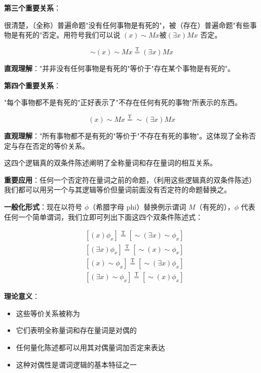 \begin{theorembox}[title=量词对偶关系的第三组]
\textbf{第三个重要关系}：

很清楚，（全称）普遍命题"没有任何事物是有死的"，被（存在）普遍命题"有些事物是有死的"否定。用符号我们可以说 $(x) \sim M x$被$(\exists x) M x$ 否定。

$$
\sim(x) \sim M x \stackrel{\mathrm{T}}{=} (\exists x) M x
$$

\textbf{直观理解}："并非没有任何事物是有死的"等价于"存在某个事物是有死的"。
\end{theorembox}

\begin{theorembox}[title=量词对偶关系的第四组]
\textbf{第四个重要关系}：

"每个事物都不是有死的"正好表示了"不存在任何有死的事物"所表示的东西。

$$
(x) \sim M x \stackrel{\mathrm{T}}{=} \sim(\exists x) M x
$$

\textbf{直观理解}："所有事物都不是有死的"等价于"不存在有死的事物"。这体现了全称否定与存在否定的等价关系。
\end{theorembox}

\begin{theorembox}[title=量词对偶关系的一般化]
这四个逻辑真的双条件陈述阐明了全称量词和存在量词的相互关系。

\textbf{重要应用}：任何一个否定符在量词之前的命题，（利用这些逻辑真的双条件陈述）我们都可以用另一个与其逻辑等价但量词前面没有否定符的命题替换之。

\textbf{一般化形式}：现在以符号 $\phi$（希腊字母 phi）替换例示谓词 $M$（有死的），$\phi$ 代表任何一个简单谓词，我们立即可列出下面这四个双条件陈述式：

$$
\begin{aligned}
& {\left[(x) \phi_{x}\right] \stackrel{\mathrm{T}}{=}\left[\sim(\exists x) \sim \phi_{x}\right]} \\
& {\left[(\exists x) \phi_{x}\right] \stackrel{\mathrm{T}}{=}\left[\sim(x) \sim \phi_{x}\right]} \\
& {\left[(x) \sim \phi_{x}\right] \stackrel{\mathrm{T}}{=}\left[\sim(\exists x) \phi_{x}\right]} \\
& {\left[(\exists x) \sim \phi_{x}\right] \stackrel{\mathrm{T}}{=}\left[\sim(x) \phi_{x}\right]}
\end{aligned}
$$

\textbf{理论意义}：
\begin{itemize}
\item 这些等价关系被称为
\item 它们表明全称量词和存在量词是对偶的
\item 任何量化陈述都可以用其对偶量词加否定来表达
\item 这种对偶性是谓词逻辑的基本特征之一
\end{itemize}
\end{theorembox}

